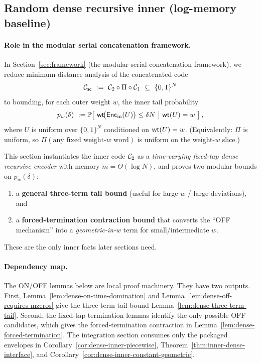\subsection{Random dense recursive inner (log-memory baseline)}
\label{sec:inner-dense}

\paragraph{Role in the modular serial concatenation framework.}
In Section~\ref{sec:framework} (the modular serial concatenation framework),
we reduce minimum-distance analysis of the concatenated code
\[
{\mathcal{C}_{\mathsf{sc}}} \ :=\ {\mathcal{C}_2} \circ \Pi \circ {\mathcal{C}_1} \ \subseteq\ \{0,1\}^N
\]
to bounding, for each outer weight $w$, the inner tail probability
\[
p_w(\delta)\ :=
\PP\!\left[\ \wt\!\big(\Enc_{\mathrm{in}}(U)\big)\le \delta N \ \middle|\ \wt(U)=w\ \right],
\]
where $U$ is uniform over $\{0,1\}^N$ conditioned on $\mathsf{wt}(U)=w$.
(Equivalently: $\Pi$ is uniform, so $\Pi(\text{any fixed weight-}w\text{ word})$ is uniform on the weight-$w$ slice.)

This section instantiates the inner code ${\mathcal{C}_2}$ as a \emph{time-varying fixed-tap dense recursive
encoder} with memory $m=\Theta(\log N)$, and proves two modular bounds on $p_w(\delta)$:
\begin{enumerate}
\item a \textbf{general three-term tail bound} (useful for large $w$ / large deviations), and
\item a \textbf{forced-termination contraction bound} that converts the ``OFF mechanism'' into a \emph{geometric-in-$w$}
term for small/intermediate $w$.
\end{enumerate}
These are the only inner facts later sections need.

\paragraph{Dependency map.}
The ON/OFF lemmas below are local proof machinery.  They have two outputs.  First,
Lemma~\ref{lem:dense-on-time-domination} and
Lemma~\ref{lem:dense-off-requires-mzeros} give the three-term tail bound
Lemma~\ref{lem:dense-three-term-tail}.  Second, the fixed-tap termination
lemmas identify the only possible OFF candidates, which gives the
forced-termination contraction in Lemma~\ref{lem:dense-forced-termination}.
The integration section consumes only the packaged envelopes in
Corollary~\ref{cor:dense-inner-piecewise},
Theorem~\ref{thm:inner-dense-interface}, and
Corollary~\ref{cor:dense-inner-constant-geometric}.

